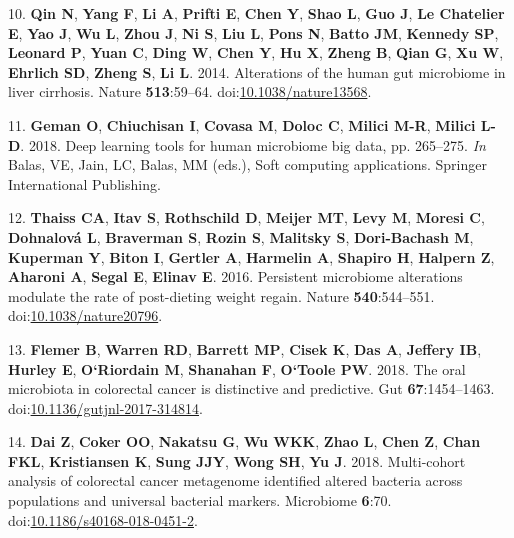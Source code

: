 \documentclass[11pt,]{article}
\begin{document}
\hypertarget{ref-qin_alterations_2014}{}
10. \textbf{Qin N}, \textbf{Yang F}, \textbf{Li A}, \textbf{Prifti E},
\textbf{Chen Y}, \textbf{Shao L}, \textbf{Guo J}, \textbf{Le Chatelier
E}, \textbf{Yao J}, \textbf{Wu L}, \textbf{Zhou J}, \textbf{Ni S},
\textbf{Liu L}, \textbf{Pons N}, \textbf{Batto JM}, \textbf{Kennedy SP},
\textbf{Leonard P}, \textbf{Yuan C}, \textbf{Ding W}, \textbf{Chen Y},
\textbf{Hu X}, \textbf{Zheng B}, \textbf{Qian G}, \textbf{Xu W},
\textbf{Ehrlich SD}, \textbf{Zheng S}, \textbf{Li L}. 2014. Alterations
of the human gut microbiome in liver cirrhosis. Nature
\textbf{513}:59--64.
doi:\href{https://doi.org/10.1038/nature13568}{10.1038/nature13568}.

\hypertarget{ref-geman_deep_2018}{}
11. \textbf{Geman O}, \textbf{Chiuchisan I}, \textbf{Covasa M},
\textbf{Doloc C}, \textbf{Milici M-R}, \textbf{Milici L-D}. 2018. Deep
learning tools for human microbiome big data, pp. 265--275. \emph{In}
Balas, VE, Jain, LC, Balas, MM (eds.), Soft computing applications.
Springer International Publishing.

\hypertarget{ref-thaiss_persistent_2016}{}
12. \textbf{Thaiss CA}, \textbf{Itav S}, \textbf{Rothschild D},
\textbf{Meijer MT}, \textbf{Levy M}, \textbf{Moresi C},
\textbf{Dohnalová L}, \textbf{Braverman S}, \textbf{Rozin S},
\textbf{Malitsky S}, \textbf{Dori-Bachash M}, \textbf{Kuperman Y},
\textbf{Biton I}, \textbf{Gertler A}, \textbf{Harmelin A},
\textbf{Shapiro H}, \textbf{Halpern Z}, \textbf{Aharoni A},
\textbf{Segal E}, \textbf{Elinav E}. 2016. Persistent microbiome
alterations modulate the rate of post-dieting weight regain. Nature
\textbf{540}:544--551.
doi:\href{https://doi.org/10.1038/nature20796}{10.1038/nature20796}.

\hypertarget{ref-flemer_oral_2018}{}
13. \textbf{Flemer B}, \textbf{Warren RD}, \textbf{Barrett MP},
\textbf{Cisek K}, \textbf{Das A}, \textbf{Jeffery IB}, \textbf{Hurley
E}, \textbf{O`Riordain M}, \textbf{Shanahan F}, \textbf{O`Toole PW}.
2018. The oral microbiota in colorectal cancer is distinctive and
predictive. Gut \textbf{67}:1454--1463.
doi:\href{https://doi.org/10.1136/gutjnl-2017-314814}{10.1136/gutjnl-2017-314814}.

\hypertarget{ref-dai_multi-cohort_2018}{}
14. \textbf{Dai Z}, \textbf{Coker OO}, \textbf{Nakatsu G}, \textbf{Wu
WKK}, \textbf{Zhao L}, \textbf{Chen Z}, \textbf{Chan FKL},
\textbf{Kristiansen K}, \textbf{Sung JJY}, \textbf{Wong SH}, \textbf{Yu
J}. 2018. Multi-cohort analysis of colorectal cancer metagenome
identified altered bacteria across populations and universal bacterial
markers. Microbiome \textbf{6}:70.
doi:\href{https://doi.org/10.1186/s40168-018-0451-2}{10.1186/s40168-018-0451-2}.
\end{document}
